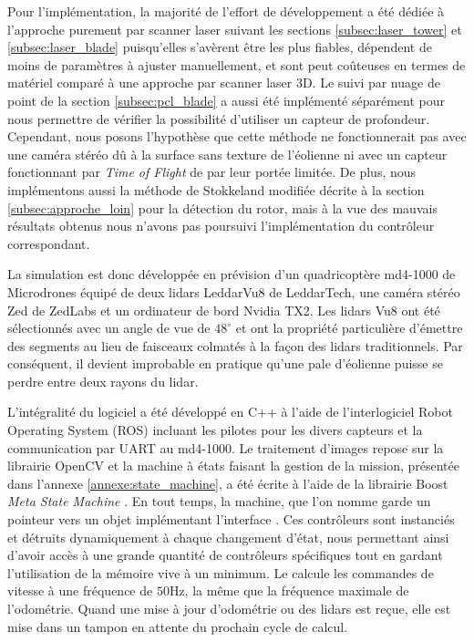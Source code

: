 Pour l'implémentation, la majorité de l'effort de développement a été dédiée à l'approche purement par scanner laser suivant les sections \ref{subsec:laser_tower} et \ref{subsec:laser_blade} puisqu'elles s'avèrent être les plus fiables, dépendent de moins de paramètres à ajuster manuellement, et sont peut coûteuses en termes de matériel comparé à une approche par scanner laser 3D. Le suivi par nuage de point de la section \ref{subsec:pcl_blade} a aussi été implémenté séparément pour nous permettre de vérifier la possibilité d'utiliser un capteur de profondeur. Cependant, nous posons l'hypothèse que cette méthode ne fonctionnerait pas avec une caméra stéréo dû à la surface sans texture de l'éolienne ni avec un capteur fonctionnant par \textit{Time of Flight} de par leur portée limitée.
De plus, nous implémentons aussi la méthode de Stokkeland modifiée décrite à la section \ref{subsec:approche_loin} pour la détection du rotor, mais à la vue des mauvais résultats obtenus nous n'avons pas poursuivi l'implémentation du contrôleur correspondant.

La simulation est donc développée en prévision d'un quadricoptère md4-1000 de Microdrones équipé de deux lidars LeddarVu8 de LeddarTech, une caméra stéréo Zed de ZedLabs et un ordinateur de bord Nvidia TX2. Les lidars Vu8 ont été sélectionnés avec un angle de vue de $48^{\circ}$ et ont la propriété particulière d'émettre des segments au lieu de faisceaux colmatés à la façon des lidars traditionnels. Par conséquent, il devient improbable en pratique qu'une pale d'éolienne puisse se perdre entre deux rayons du lidar.

L'intégralité du logiciel a été développé en C++ à l'aide de l'interlogiciel
Robot Operating System (ROS) incluant les pilotes pour les divers capteurs et la communication par UART au md4-1000. Le traitement d'images repose sur la librairie OpenCV \citep{itseez2015} et la machine à états faisant la gestion de la mission, présentée dans l'annexe \ref{annexe:state_machine}, a été écrite à l'aide de la librairie Boost \textit{Meta State Machine} \citep{Schling2011}. En tout temps, la machine, que l'on nomme  garde un pointeur vers un objet implémentant l'interface . Ces contrôleurs sont instanciés et détruits dynamiquement à chaque changement d'état, nous permettant ainsi d'avoir accès à une grande quantité de contrôleurs spécifiques tout en gardant l'utilisation de la mémoire vive à un minimum. Le  calcule les commandes de vitesse à une fréquence de $50$Hz, la même que la fréquence maximale de l'odométrie. Quand une mise à jour d'odométrie ou des lidars est reçue, elle est mise dans un tampon en attente du prochain cycle de calcul.

